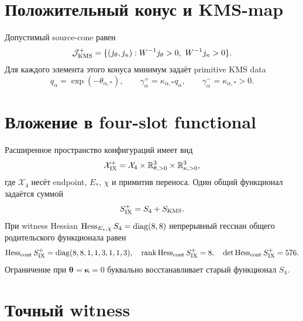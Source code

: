\section{Положительный конус и KMS-map}

Допустимый source-cone равен
\begin{equation}
 \mathcal J_{\rm KMS}^{+}
 =\{(j_\theta,j_\kappa):W^{-1}j_\theta>0,\
 W^{-1}j_\kappa>0\}.
 \label{eq:v9-kms-source-parent-positive-cone}
\end{equation}
Для каждого элемента этого конуса минимум задаёт primitive KMS data
\begin{equation}
 q_\alpha=\exp(-\theta_{\alpha,*}),
 \qquad
 \gamma_\alpha^+=\kappa_{\alpha,*}q_\alpha,
 \qquad
 \gamma_\alpha^-=\kappa_{\alpha,*}>0.
 \label{eq:v9-kms-source-parent-kms-map}
\end{equation}

\section{Вложение в four-slot functional}

Расширенное пространство конфигураций имеет вид
\begin{equation}
 \mathcal X_{\rm IX}^{+}
 =\mathcal X_4\times\mathbb R^3_{\theta,>0}
 \times\mathbb R^3_{\kappa,>0},
 \label{eq:v9-kms-source-parent-common-domain}
\end{equation}
где $\mathcal X_4$ несёт endpoint, $E_*$, $\chi$ и примитив переноса.
Один общий функционал задаётся суммой
\begin{equation}
 S_{\rm IX}^{+}=S_4+S_{\rm KMS}.
 \label{eq:v9-kms-source-parent-common-functional}
\end{equation}
При witness Hessian $\operatorname{Hess}_{E_*,\chi}S_4=\operatorname{diag}(8,8)$
непрерывный гессиан общего родительского функционала равен
\begin{equation}
 \operatorname{Hess}_{\rm cont}S_{\rm IX}^{+}
 =\operatorname{diag}(8,8,1,1,3,1,1,3),
 \quad
 \operatorname{rank}\operatorname{Hess}_{\rm cont}S_{\rm IX}^{+}=8,
 \quad
 \det\operatorname{Hess}_{\rm cont}S_{\rm IX}^{+}=576.
 \label{eq:v9-kms-source-parent-common-hessian}
\end{equation}
Ограничение при $\boldsymbol\theta=\boldsymbol\kappa=0$ буквально
восстанавливает старый функционал $S_4$.

\section{Точный witness}

